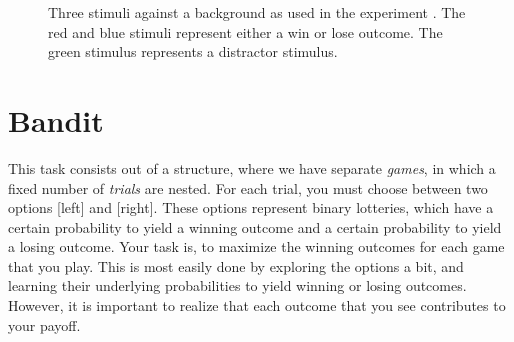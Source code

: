 \documentclass[12pt, oneside]{scrartcl}
\begin{document}
\pagebreak


\begin{figure}[h!]
\begin{center}

\captionsetup{width=.9\linewidth, format=plain}
\caption[Experimental Stimuli]{Three stimuli against a background as used in the experiment . The red and blue stimuli represent either a win or lose outcome. The green stimulus represents a distractor stimulus.}
\label{fig:stimuli}
\end{center}
\end{figure}





\pagebreak
\section{Bandit}

This task consists out of a structure, where we have separate \textit{games}, in which a fixed number of \textit{trials} are nested. For each trial, you must choose between two options [left] and [right]. These options represent binary lotteries, which have a certain probability to yield a winning outcome and a certain probability to yield a losing outcome. Your task is, to maximize the winning outcomes for each game that you play. This is most easily done by exploring the options a bit, and learning their underlying probabilities to yield winning or losing outcomes. However, it is important to realize that each outcome that you see contributes to your payoff.  \vspace{\baselineskip}
\end{document}

